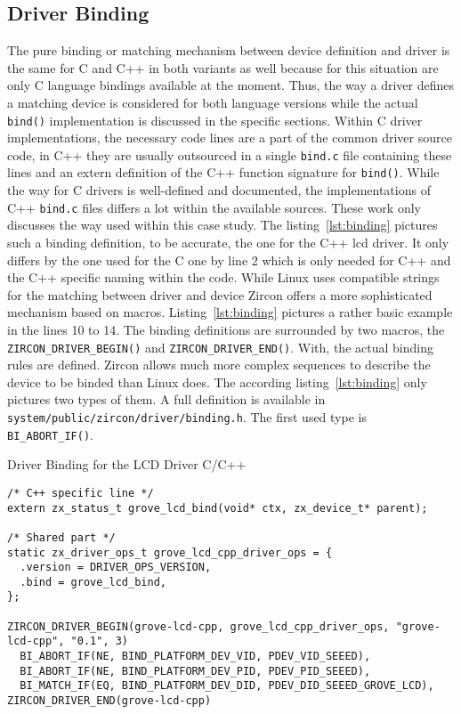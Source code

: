 \subsection{Driver Binding}
The pure binding or matching mechanism between device definition and driver is the same for C and C++ in both variants as well because for this situation are only C language bindings available at the moment.
Thus, the way a driver defines a matching device is considered for both language versions while the actual \texttt{bind()} implementation is discussed in the specific sections.
Within C driver implementations, the necessary code lines are a part of the common driver source code, in C++ they are usually outsourced in a single \texttt{bind.c} file containing these lines and an extern definition of the C++ function signature for \texttt{bind()}.
While the way for C drivers is well-defined and documented, the implementations of C++ \texttt{bind.c} files differs a lot within the available sources.
These work only discusses the way used within this case study.
The listing~\ref{lst:binding} pictures such a binding definition, to be accurate, the one for the C++ \ac{lcd} driver.
It only differs by the one used for the C one by line 2 which is only needed for C++ and the C++ specific naming within the code.
While Linux uses compatible strings for the matching between driver and device Zircon offers a more sophisticated mechanism based on macros.
Listing~\ref{lst:binding} pictures a rather basic example in the lines 10 to 14.
The binding definitions are surrounded by two macros, the \texttt{ZIRCON_DRIVER_BEGIN()} and \texttt{ZIRCON_DRIVER_END()}.
With, the actual binding rules are defined.
Zircon allows much more complex sequences to describe the device to be binded than Linux does.
The according listing~\ref{lst:binding} only pictures two types of them.
A full definition is available in \texttt{system/public/zircon/driver/binding.h}.
The first used type is \texttt{BI_ABORT_IF()}.
%
\begin{listing} [H]
\caption{Driver Binding for the LCD Driver C/C++}
\label{lst:binding}
\begin{verbatim}
/* C++ specific line */
extern zx_status_t grove_lcd_bind(void* ctx, zx_device_t* parent);

/* Shared part */
static zx_driver_ops_t grove_lcd_cpp_driver_ops = {
  .version = DRIVER_OPS_VERSION,
  .bind = grove_lcd_bind,
};

ZIRCON_DRIVER_BEGIN(grove-lcd-cpp, grove_lcd_cpp_driver_ops, "grove-lcd-cpp", "0.1", 3)
  BI_ABORT_IF(NE, BIND_PLATFORM_DEV_VID, PDEV_VID_SEEED),
  BI_ABORT_IF(NE, BIND_PLATFORM_DEV_PID, PDEV_PID_SEEED),
  BI_MATCH_IF(EQ, BIND_PLATFORM_DEV_DID, PDEV_DID_SEEED_GROVE_LCD),
ZIRCON_DRIVER_END(grove-lcd-cpp)
\end{verbatim}
\end{listing}
